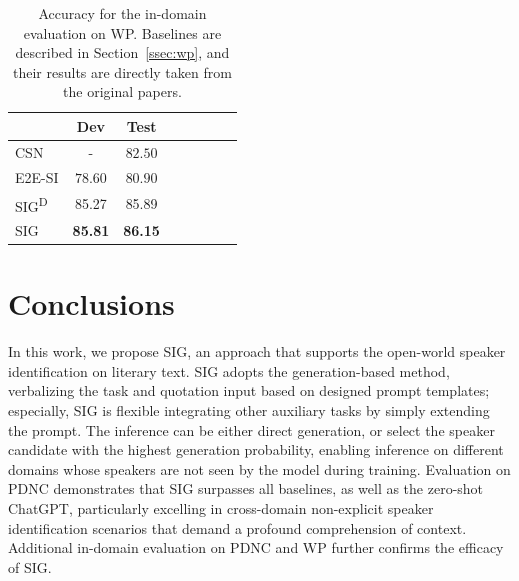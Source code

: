 \documentclass[letterpaper]{article} %
\begin{document}
\begin{table}[htbp!]
    \centering
    \begin{tabular}{l|c c c c c c c}
    \toprule
       & Dev & Test \\
       \midrule
        CSN & - & $82.50$ \\
        E2E-SI & $78.60$ & $80.90 $ \\
        SIG\textsuperscript{D} & 85.27 & 85.89\\
        SIG & \textbf{85.81} & \textbf{86.15} \\
        \bottomrule
    \end{tabular}
    \caption{Accuracy for the in-domain evaluation on WP. Baselines are described in Section~\ref{ssec:wp}, and their results are directly taken from the original papers.}
    \label{tab:chinese-result}
\end{table}


\section{Conclusions}
In this work, we propose SIG, an approach that supports the open-world speaker identification on literary text. SIG adopts the generation-based method, verbalizing the task and quotation input based on designed prompt templates; especially, SIG is flexible integrating other auxiliary tasks by simply extending the prompt. The inference can be either direct generation, or select the speaker candidate with the highest generation probability, enabling inference on different domains whose speakers are not seen by the model during training.
Evaluation on PDNC demonstrates that SIG surpasses all baselines, as well as the zero-shot ChatGPT, particularly excelling in cross-domain non-explicit speaker identification scenarios that demand a profound comprehension of context. Additional in-domain evaluation on PDNC and WP further confirms the efficacy of SIG.
\end{document}
